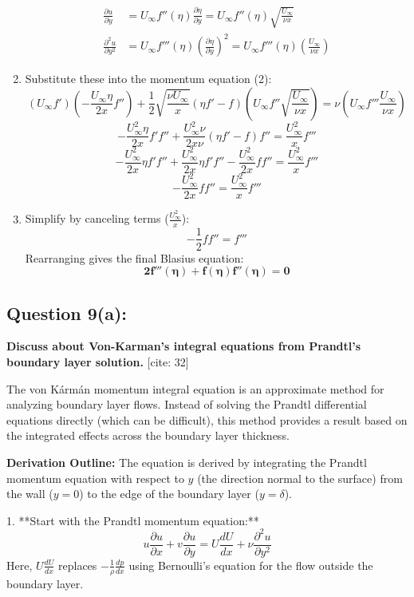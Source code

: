 \documentclass{article}
\begin{document}
\begin{enumerate}
\begin{align*}
        \frac{\partial u}{\partial y} &= U_\infty f''(\eta) \frac{\partial \eta}{\partial y} = U_\infty f''(\eta) \sqrt{\frac{U_\infty}{\nu x}} \\
        \frac{\partial^2 u}{\partial y^2} &= U_\infty f'''(\eta) \left(\frac{\partial \eta}{\partial y}\right)^2 = U_\infty f'''(\eta) \left(\frac{U_\infty}{\nu x}\right)
    \end{align*}
    \item Substitute these into the momentum equation (2):
    $$ (U_\infty f')\left(- \frac{U_\infty \eta}{2x} f''\right) + \frac{1}{2}\sqrt{\frac{\nu U_\infty}{x}} (\eta f' - f) \left(U_\infty f'' \sqrt{\frac{U_\infty}{\nu x}}\right) = \nu \left(U_\infty f''' \frac{U_\infty}{\nu x}\right) $$
    $$ -\frac{U_\infty^2 \eta}{2x} f'f'' + \frac{U_\infty^2 \nu}{2x\nu} (\eta f' - f)f'' = \frac{U_\infty^2}{x} f''' $$
    $$ -\frac{U_\infty^2}{2x} \eta f'f'' + \frac{U_\infty^2}{2x} \eta f'f'' - \frac{U_\infty^2}{2x} f f'' = \frac{U_\infty^2}{x} f''' $$
    $$ -\frac{U_\infty^2}{2x} f f'' = \frac{U_\infty^2}{x} f''' $$
    \item Simplify by canceling terms ($\frac{U_\infty^2}{x}$):
    $$ -\frac{1}{2} f f'' = f''' $$
    Rearranging gives the final Blasius equation:
    $$ \mathbf{2f'''(\eta) + f(\eta)f''(\eta) = 0} $$
\end{enumerate}
\hrulefill

\subsection*{\textbf{Question 9(a):}}
\textbf{Discuss about Von-Karman's integral equations from Prandtl's boundary layer solution.} [cite: 32]

The von Kármán momentum integral equation is an approximate method for analyzing boundary layer flows. Instead of solving the Prandtl differential equations directly (which can be difficult), this method provides a result based on the integrated effects across the boundary layer thickness.

\textbf{Derivation Outline:}
The equation is derived by integrating the Prandtl momentum equation with respect to $y$ (the direction normal to the surface) from the wall ($y=0$) to the edge of the boundary layer ($y=\delta$).

1.  **Start with the Prandtl momentum equation:**
    $$ u\frac{\partial u}{\partial x} + v\frac{\partial u}{\partial y} = U\frac{dU}{dx} + \nu \frac{\partial^2 u}{\partial y^2} $$
    Here, $U\frac{dU}{dx}$ replaces $-\frac{1}{\rho}\frac{dp}{dx}$ using Bernoulli's equation for the flow outside the boundary layer.
\end{document}
